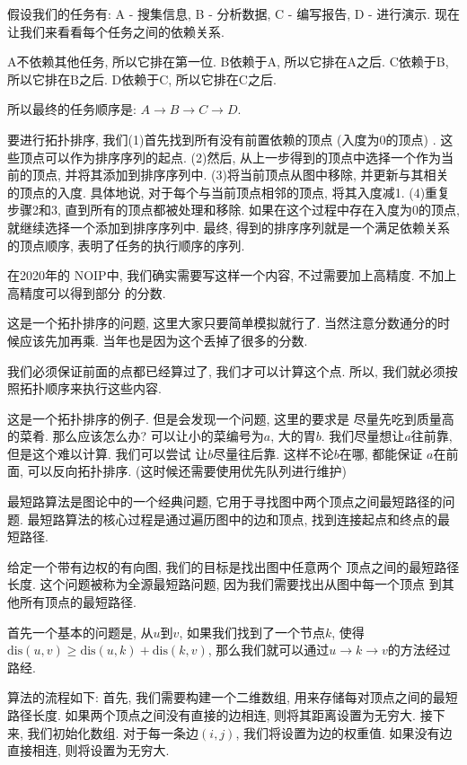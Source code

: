 假设我们的任务有: A - 搜集信息, B - 分析数据, C - 编写报告, D - 进行演示. 
现在让我们来看看每个任务之间的依赖关系. 

A不依赖其他任务, 所以它排在第一位. 
B依赖于A, 所以它排在A之后. 
C依赖于B, 所以它排在B之后. 
D依赖于C, 所以它排在C之后. 

所以最终的任务顺序是: $A \rightarrow  B \rightarrow  C \rightarrow  D$. 

要进行拓扑排序, 我们(1)首先找到所有没有前置依赖的顶点 (入度为0的顶点) . 
这些顶点可以作为排序序列的起点. (2)然后, 从上一步得到的顶点中选择一个作为当
前的顶点, 并将其添加到排序序列中. (3)将当前顶点从图中移除, 
并更新与其相关的顶点的入度. 具体地说, 对于每个与当前顶点相邻的顶点, 将其入度减1. 
(4)重复步骤2和3, 直到所有的顶点都被处理和移除. 
如果在这个过程中存在入度为0的顶点, 就继续选择一个添加到排序序列中. 
最终, 得到的排序序列就是一个满足依赖关系的顶点顺序, 表明了任务的执行顺序的序列.

在2020年的
NOIP中, 我们确实需要写这样一个内容, 不过需要加上高精度. 不加上高精度可以得到部分
的分数. 

 这是一个拓扑排序的问题, 这里大家只要简单模拟就行了. 
当然注意分数通分的时候应该先加再乘. 当年也是因为这个丢掉了很多的分数. 

 我们必须保证前面的点都已经算过了, 我们才可以计算这个点. 
所以, 我们就必须按照拓扑顺序来执行这些内容.

 这是一个拓扑排序的例子. 但是会发现一个问题, 这里的要求是
尽量先吃到质量高的菜肴. 那么应该怎么办? 可以让小的菜编号为$a$, 
大的胃$b$. 我们尽量想让$a$往前靠, 但是这个难以计算. 我们可以尝试
让$b$尽量往后靠. 这样不论$b$在哪, 都能保证
$a$在前面, 可以反向拓扑排序. (这时候还需要使用优先队列进行维护) 


 最短路算法是图论中的一个经典问题, 它用于寻找图中两个顶点之间最短路径的问题. 
最短路算法的核心过程是通过遍历图中的边和顶点, 找到连接起点和终点的最短路径. 

 给定一个带有边权的有向图, 我们的目标是找出图中任意两个
顶点之间的最短路径长度. 这个问题被称为全源最短路问题, 因为我们需要找出从图中每一个顶点
到其他所有顶点的最短路径. 

首先一个基本的问题是, 从$u$到$v$, 如果我们找到了一个节点$k$, 使得
$\text{dis}(u,v)\geq \text{dis}(u,k)+\text{dis}(k,v)$,
那么我们就可以通过$u\to k\to v$的方法经过路经. 

算法的流程如下: 首先, 我们需要构建一个二维数组, 用来存储每对顶点之间的最短路径长度. 
如果两个顶点之间没有直接的边相连, 则将其距离设置为无穷大. 接下来, 我们初始化数组. 
对于每一条边$(i, j)$, 我们将设置为边的权重值. 如果没有边直接相连, 
则将设置为无穷大. 

